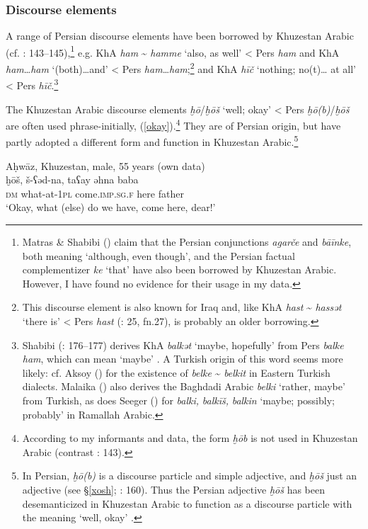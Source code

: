 \documentclass[output=paper,nonflat]{langsci/langscibook}
\begin{document}
\subsubsection{Discourse elements}

A range of Persian discourse elements have been borrowed by Khuzestan Arabic (cf. \citealt{MatrasShabibi2007}: 143–145),\footnote{Matras \& Shabibi (\citeyear[144]{MatrasShabibi2007}) claim that the Persian conjunctions \textit{agarče} and \textit{bāīnke}, both meaning ‘although, even though’, and the Persian factual complementizer \textit{ke} ‘that’ have also been borrowed by Khuzestan Arabic. However, I have found no evidence for their usage in my data.} e.g. KhA \textit{ham} \~{} \textit{hamme} ‘also, as well’ < Pers \textit{ham} and KhA \textit{ham}…\textit{ham} ‘(both)…and’ < Pers \textit{ham}…\textit{ham};\footnote{This discourse element is also known for Iraq \citep[36]{Malaika1963} and, like KhA \textit{hast} \~{} \textit{hassət} ‘there is’ < Pers \textit{hast} (\citealt{Ingham1973}: 25, fn.27), is probably an older borrowing.} and KhA \textit{hīč} ‘nothing; no(t)… at all’ < Pers \textit{hīč}.\footnote{Shabibi (\citeyear{Shabibi2006}: 176–177) derives KhA \textit{balkət} ‘maybe, hopefully’ from Pers \textit{balke} \textit{ham}, which can mean ‘maybe’ . A Turkish origin of this word seems more likely: cf. Aksoy (\citeyear[620]{Aksoy1963}) for the existence of \textit{belke} \~{} \textit{belkit} in Eastern Turkish dialects. Malaika (\citeyear[35]{Malaika1963}) also derives the Baghdadi Arabic \textit{belki} ‘rather, maybe’ from Turkish, as does Seeger (\citeyear[28]{Seeger2009}) for \textit{balki,} \textit{balkīš,} \textit{balkin} ‘maybe; possibly; probably’ in Ramallah Arabic.} 

The Khuzestan Arabic discourse elements \textit{ḫō}/\textit{ḫōš} ‘well; okay’ < Pers \textit{ḫō(b)}/\textit{ḫōš} are often used phrase-initially, (\ref{okay}).\footnote{According to my informants and data, the form \textit{ḫōb} is not used in Khuzestan Arabic (contrast \citealt{MatrasShabibi2007}: 143).} They are of Persian origin, but have partly adopted a different form and function in Khuzestan Arabic.\footnote{In Persian, \textit{ḫō(b)} is a discourse particle and simple adjective, and \textit{ḫōš} just an adjective (see §\ref{xosh}; \citealt{Shabibi2006}: 160). Thus the Persian adjective \textit{ḫōš} has been desemanticized in Khuzestan Arabic to function as a discourse particle with the meaning ‘well, okay’ \citep[160]{Shabibi2006}.}

\ea\label{okay}
{Aḥwāz, Khuzestan, male, 55 years (own data)}\\
\gll ḫōš, š-ʕəd-na, taʕay əhna baba\\
     \textsc{dm} what-at-\textsc{1pl} come.\textsc{imp}.\textsc{sg.}\textsc{f} here father\\
\glt ‘Okay, what (else) do we have, come here, dear!’
\z
\end{document}
